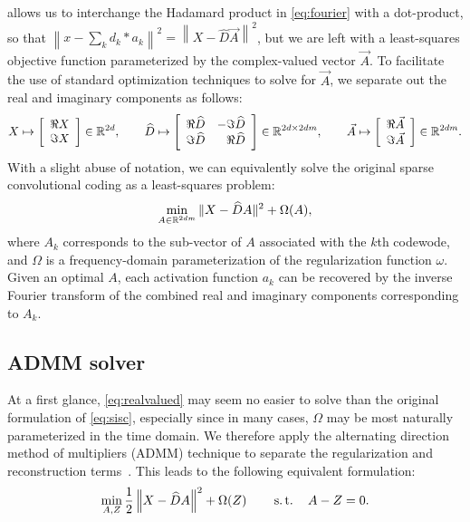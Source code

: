 \documentclass{article} %
\begin{document}
 allows us to interchange the Hadamard product in
\eqref{eq:fourier} with a dot-product, so that 
$\left\|x - \sum_k d_k * a_k\right\|^2 =  \left\|X - \widehat{D}\vec{A}\right\|^2$,
but we are left with a least-squares objective function parameterized by the complex-valued 
vector $\vec{A}$. To facilitate the use of standard optimization techniques to solve for
$\vec{A}$, we separate out the real and imaginary components as follows:
\begin{equation}
X \mapsto \left[\begin{array}{r}\Re X \\ \Im X\end{array}\right] \in \mathbb{R}^{2d},
\quad\quad \widehat{D} \mapsto \left[\begin{array}{rr}\Re \widehat{D} & - \Im \widehat{D}\\
\Im \widehat{D} & \Re \widehat{D}\end{array}\right] \in \mathbb{R}^{2d\times 2dm},
\quad\quad \vec{A} \mapsto \left[\begin{array}{r}\Re \vec{A} \\ \Im \vec{A}\end{array}\right]
\in \mathbb{R}^{2dm}.\label{eq:realized}
\end{equation}
With a slight abuse of notation, we can equivalently solve the original sparse
convolutional coding as a least-squares problem:
\begin{equation}
\min_{A \in \mathbb{R}^{2dm}} \|X - \widehat{D}A\|^2 + \Omega(A),\label{eq:realvalued}
\end{equation}
where $A_k$ corresponds to the sub-vector of $A$ associated with the $k$th codewode, and 
$\Omega$ is a frequency-domain parameterization of the regularization function $\omega$.
Given an optimal $A$, each activation function $a_k$ can be 
recovered by the inverse Fourier transform of the combined real and imaginary components
corresponding to $A_k$.

\subsection{ADMM solver}
\label{sec:solver}
At a first glance, \eqref{eq:realvalued} may seem no easier to solve than the original
formulation of \eqref{eq:sisc}, especially since in many cases, $\Omega$ may be most
naturally parameterized in the time domain.  We therefore apply the alternating
direction method of multipliers (ADMM) technique to separate the regularization and
reconstruction terms~\cite{boyd2011}.  This leads to the following equivalent
formulation:
\begin{equation}
\min_{A, Z} \frac{1}{2}\left\|X - \widehat{D}A\right\|^2 + \Omega(Z)
\quad\quad \operatorname{s.t.}\quad A - Z = 0.\label{eq:admm}
\end{equation}
\end{document}
